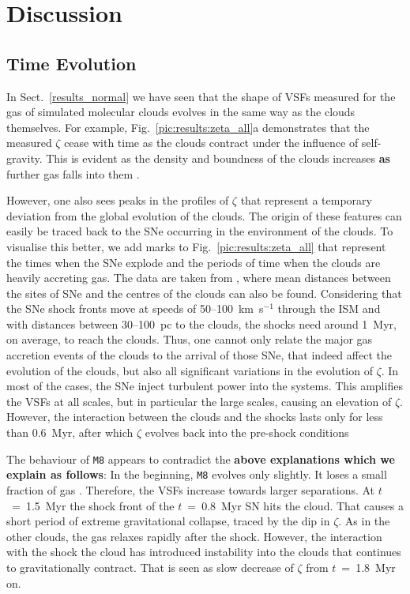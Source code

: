 \section{Discussion}\label{discussion}

\subsection{Time Evolution}\label{discussion:normal}

In Sect.~\ref{results_normal} we have seen that the shape of VSFs measured for the gas of simulated molecular clouds evolves in the same way as the clouds themselves.
For example, Fig.~\ref{pic:results:zeta_all}a demonstrates that the measured $\zeta$ cease with time as the clouds contract under the influence of self-gravity.
This is evident as the density and boundness of the clouds increases \textbf{as} further gas falls into them .

However, one also sees peaks in the profiles of $\zeta$ that represent a temporary deviation from the global evolution of the clouds.
The origin of these features can easily be traced back to the SNe occurring in the environment of the clouds.
To visualise this better, we add marks to Fig.~\ref{pic:results:zeta_all} that represent the times when the SNe explode and the periods of time when the clouds are heavily accreting gas.
The data are taken from , where mean distances between the sites of SNe and the centres of the clouds can also be found.
Considering that the SNe shock fronts move at speeds of 50--100~km~s$^{-1}$ through the ISM and with distances between 30--100~pc to the clouds, the shocks need around 1~Myr, on average, to reach the clouds.
Thus, one cannot only relate the major gas accretion events of the clouds to the arrival of those SNe, that indeed affect the evolution of the clouds, but also all significant variations in the evolution of $\zeta$.
In most of the cases, the SNe inject turbulent power into the systems.
This amplifies the VSFs at all scales, but in particular the large scales, causing an elevation of $\zeta$.
However, the interaction between the clouds and the shocks lasts only for less than 0.6~Myr, after which $\zeta$ evolves back into the pre-shock conditions

The behaviour of \texttt{M8} appears to contradict the \textbf{above explanations which we explain as follows}:
In the beginning, \texttt{M8} evolves only slightly.
It loses a small fraction of gas .
Therefore, the VSFs increase towards larger separations.
At $t$~=~1.5~Myr the shock front of the $t$~=~0.8~Myr SN hits the cloud.
That causes a short period of extreme gravitational collapse, traced by the dip in $\zeta$.
As in the other clouds, the gas relaxes rapidly after the shock.
However, the interaction with the shock the cloud has introduced instability into the clouds that continues to gravitationally contract.
That is seen as slow decrease of $\zeta$ from $t$~=~1.8~Myr on. 

